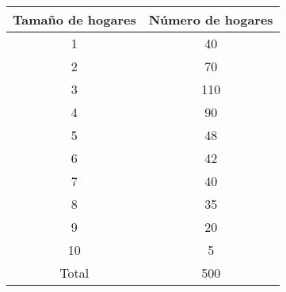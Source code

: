 \documentclass{exam}
\begin{document}
\begin{questions}
\begin{table}[H]
	\centering
	\begin{tabular}{|c|c|}
		\hline
		Tamaño de hogares & Número de hogares\\
		 \hline
		 1 & 40\\
		 \hline
		 2 & 70\\
		 \hline
		 3 & 110\\
		 \hline
		 4 & 90\\
		 \hline
		 5 & 48\\
		 \hline
		 6 & 42\\
		 \hline
		 7 & 40\\
		 \hline
		 8 & 35\\
		 \hline
		 9 & 20\\
		 \hline
		 10 & 5\\
		 \hline
		 Total & 500\\
		 \hline
	\end{tabular}
\end{table}


\end{questions}
\end{document}

